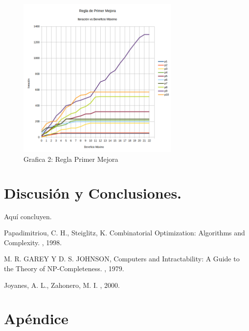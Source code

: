 \documentclass{ci5652}
\begin{document}
 	\begin{figure}[h]
 	\caption{Grafica 2: Regla Primer Mejora}
	
	\includegraphics[width=8cm, height=8cm]{first_imp-it-vs-ben_max.png}
	\end{figure}


\section{Discusión y Conclusiones.}
	Aquí concluyen.


\small


\begin{thebibliography}{99}

Papadimitriou, C. H., Steiglitz, K. 
\newblock Combinatorial Optimization: Algorithms and Complexity. 
, 1998.


M. R. GAREY Y D. S. JOHNSON,
\newblock Computers and Intractability: A Guide to the Theory of NP-Completeness.
, 1979.

Joyanes, A. L., Zahonero, M. I. 
, 2000.

\end{thebibliography}


\newpage
\section*{Apéndice}
\end{document}
